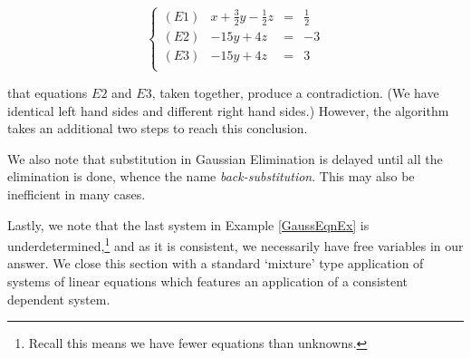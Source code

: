 \documentclass{ximera}
\begin{document}
\[ \left\{ \begin{array}{lrcr} (E1) & x+\frac{3}{2}y-\frac{1}{2}z & = & \frac{1}{2} \\ [3pt]
(E2) & -15y+4z & = & -3 \\ [3pt]
(E3) & -15y+4z & = & 3 \\ \end{array}  \right.\] 

that equations $E2$ and $E3$,  taken together,  produce a contradiction. (We have identical left hand sides and different right hand sides.)  However, the algorithm takes an additional two steps to reach this conclusion.  

We also note that substitution in Gaussian Elimination is delayed until all the elimination is done, whence the name   \textit{back-substitution}.  This may also be inefficient in many cases.

Lastly, we note that the last system in Example \ref{GaussEqnEx} is underdetermined,\footnote{Recall this means we have fewer equations than unknowns.}  and as it is consistent, we necessarily have free variables in our answer.  We close this section with a standard `mixture' type application of systems of linear equations which features an application of a consistent dependent system.
\end{document}
